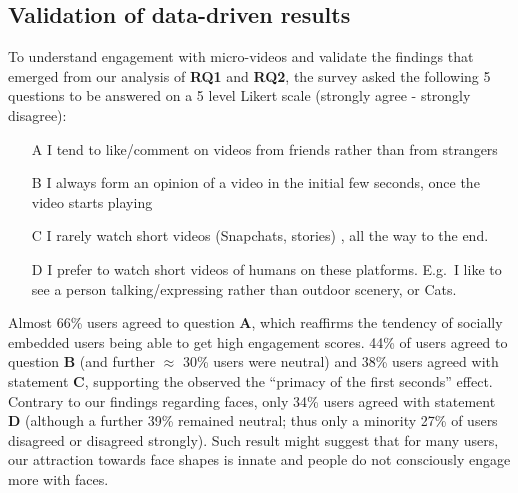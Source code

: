 
\subsection{Validation of data-driven results}
To understand engagement with micro-videos and validate the findings that emerged from our analysis of \textbf{RQ1} and \textbf{RQ2}, the survey asked the following 5 questions
to be answered on a 5 level Likert scale (strongly agree - strongly disagree):
\begin{enumerate}
\small 
\item [A] I tend to like/comment on videos from friends rather than from strangers
\item [B] I always form an opinion of a video in the initial few seconds, once the video starts playing
\item [C] I rarely watch short videos (Snapchats, stories) , all the way to the end.
\item [D] I prefer to watch short videos of humans on these platforms. E.g.\ I like to see a person talking/expressing rather than outdoor scenery, or Cats.
\end{enumerate}

Almost 66\% users agreed to question \textbf{A}, which reaffirms the tendency of socially embedded users being able to get high engagement scores. 44\% of users agreed to question \textbf{B} (and further $\approx$ 30\% users were neutral) and 38\% users agreed with statement \textbf{C}, supporting the observed the ``primacy of the first seconds'' effect.
Contrary to our findings regarding faces, only 34\% users agreed with statement  \textbf{D} (although a further 39\% remained neutral; thus only a minority 27\% of users disagreed or disagreed strongly). Such result might suggest that for many users, our attraction towards face shapes is innate \cite{slater1998innate} and people do not consciously engage more with faces. %

